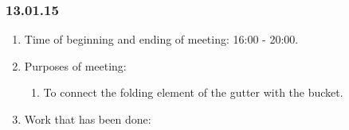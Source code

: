 \subsubsection{13.01.15}
\begin{enumerate}
	
	\item Time of beginning and ending of meeting: 16:00 - 20:00.
	
	\item Purposes of meeting: 
	\begin{enumerate}
		
		\item To connect the folding element of the gutter with the bucket.
		
	\end{enumerate}

	\item Work that has been done:
	\begin{enumerate}
		

\end{enumerate}
\end{enumerate}
